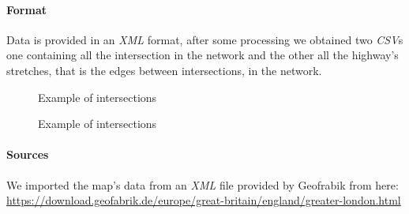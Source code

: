 \paragraph{Format}
Data is provided in an \textit{XML} format, after some processing we obtained 
two \textit{CSV}s one containing all the intersection in the network and the 
other all the highway's stretches, that is the edges between intersections, in 
the network.

\begin{figure}[H]
	
	\caption{Example of intersections}
\end{figure}

\begin{figure}[H]
	
	\caption{Example of intersections}
\end{figure}

\paragraph{Sources}
We imported the map's data from an \textit{XML} file provided by Geofrabik from 
here: 
\url{https://download.geofabrik.de/europe/great-britain/england/greater-london.html}


